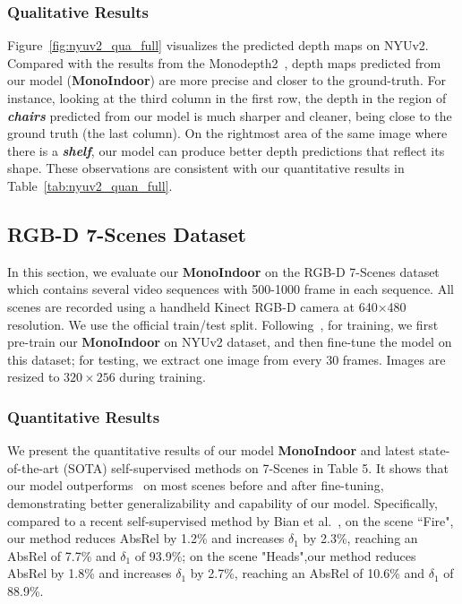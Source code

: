 \subsubsection{Qualitative Results}

Figure~\ref{fig:nyuv2_qua_full} visualizes the predicted depth maps on NYUv2. Compared with the results from the Monodepth2~\cite{godard2019digging}, depth maps predicted from our model (\textbf{MonoIndoor}) are more precise and closer to the ground-truth. For instance, looking at the third column in the first row, the depth in the region of \textbf{\textit{chairs}} predicted from our model is much sharper and cleaner, 
being close to the ground truth (the last column). On the rightmost area of the same image where there is a \textbf{\textit{shelf}}, our model can produce better depth predictions that reflect its shape. These observations are consistent with our quantitative results in Table~\ref{tab:nyuv2_quan_full}.


\subsection{RGB-D 7-Scenes Dataset}
In this section, we evaluate our \textbf{MonoIndoor} on the RGB-D 7-Scenes dataset \cite{Shotton_2013_CVPR} which contains several video sequences with 500-1000 frame in each sequence. All scenes are recorded using a handheld Kinect RGB-D camera at 640×480 resolution. We use the official train/test split. Following~\cite{bian2020unsupervised}, for training, we first pre-train our \textbf{MonoIndoor} on NYUv2 dataset, and then fine-tune the model on this dataset; for testing, we extract one image from every 30 frames. Images are resized to $320\times256$ during training.

\subsubsection{Quantitative Results}

We present the quantitative results of our model \textbf{MonoIndoor} and latest state-of-the-art (SOTA) self-supervised methods on 7-Scenes in Table 5. It shows that our model outperforms~\cite{bian2020unsupervised} on most scenes before and after fine-tuning, demonstrating better generalizability and capability of our model. Specifically, compared to a recent self-supervised method by Bian et al.~\cite{bian2020unsupervised}, on the scene ``Fire", our method reduces AbsRel by 1.2\% and increases $\delta_1$ by 2.3\%, reaching an AbsRel of 7.7\% and $\delta_1$ of 93.9\%; on the scene "Heads",our method reduces AbsRel by 1.8\% and increases $\delta_1$ by 2.7\%, reaching an AbsRel of 10.6\% and $\delta_1$ of 88.9\%.


